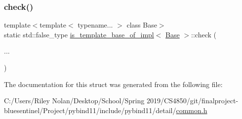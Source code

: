 \mbox{\label{structis__template__base__of__impl_a1223262875fc83b72c685b57747e9641}} 
\subsubsection{\texorpdfstring{check()}{check()}\hspace{0.1cm}{\footnotesize\ttfamily [2/2]}}
{\footnotesize\ttfamily template$<$template$<$ typename... $>$ class Base$>$ \\
static std\+::false\+\_\+type \mbox{\hyperlink{structis__template__base__of__impl}{is\+\_\+template\+\_\+base\+\_\+of\+\_\+impl}}$<$ \mbox{\hyperlink{struct_base}{Base}} $>$\+::check (\begin{DoxyParamCaption}\item[{}]{... }\end{DoxyParamCaption})\hspace{0.3cm}{\ttfamily [static]}}



The documentation for this struct was generated from the following file\+:\begin{DoxyCompactItemize}
\item 
C\+:/\+Users/\+Riley Nolan/\+Desktop/\+School/\+Spring 2019/\+C\+S4850/git/finalproject-\/bluesentinel/\+Project/pybind11/include/pybind11/detail/\mbox{\hyperlink{detail_2common_8h}{common.\+h}}\end{DoxyCompactItemize}
